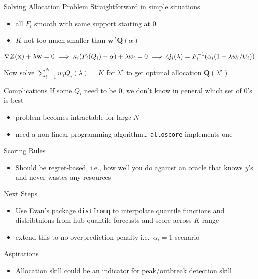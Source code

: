 \documentclass[
  ignorenonframetext,
]{beamer}
\providecommand{\tightlist}{%
  \setlength{\itemsep}{0pt}\setlength{\parskip}{0pt}}\usepackage{longtable,booktabs,array}
\begin{document}
\begin{frame}{Solving Allocation Problem}
\protect\hypertarget{solving-allocation-problem}{}
Straightforward in simple situations

\begin{itemize}
\tightlist
\item
  all \(F_i\) smooth with same support starting at 0
\item
  \(K\) not too much smaller than \(\mathbf{w}^T \mathbf{Q}(\alpha)\)
\end{itemize}

\[
\nabla Z(\mathbf{x}) + \lambda \mathbf{w} =0 \\
\implies \kappa_i(F_i(Q_i) - \alpha) + \lambda w_i = 0 \\
\implies Q_i(\lambda) = F_i^{-1}(\alpha_i(1 - \lambda w_i / U_i))
\]

Now solve \(\sum_{i=1}^N w_i Q_i(\lambda)=K\) for \(\lambda^{\star}\) to
get optimal allocation \(\mathbf{Q}(\lambda^{\star})\).
\end{frame}

\begin{frame}[fragile]{Complications}
\protect\hypertarget{complications}{}
If some \(Q_i\) need to be 0, we don't know in general which set of 0's
is best

\begin{itemize}
\tightlist
\item
  problem becomes intractable for large \(N\)
\item
  need a non-linear programming algorithm\ldots{} \texttt{alloscore}
  implements one
\end{itemize}
\end{frame}

\begin{frame}{Scoring Rules}
\protect\hypertarget{scoring-rules}{}
\begin{itemize}
\tightlist
\item
  Should be regret-based, i.e., how well you do against an oracle that
  knows \(y\)'s and never wastes any resources
\end{itemize}
\end{frame}

\begin{frame}[fragile]{Next Steps}
\protect\hypertarget{next-steps}{}
\begin{itemize}
\item
  Use Evan's package
  \href{https://github.com/reichlab/distfromq}{\texttt{distfromq}} to
  interpolate quantile functions and distribtuions from hub quantile
  forecasts and score across \(K\) range
\item
  extend this to no overprediction penalty i.e.~\(\alpha_i = 1\)
  scenario
\end{itemize}
\end{frame}

\begin{frame}{Aspirations}
\protect\hypertarget{aspirations}{}
\begin{itemize}
\tightlist
\item
  Allocation skill could be an indicator for peak/outbreak detection
  skill
\end{itemize}
\end{frame}
\end{document}
